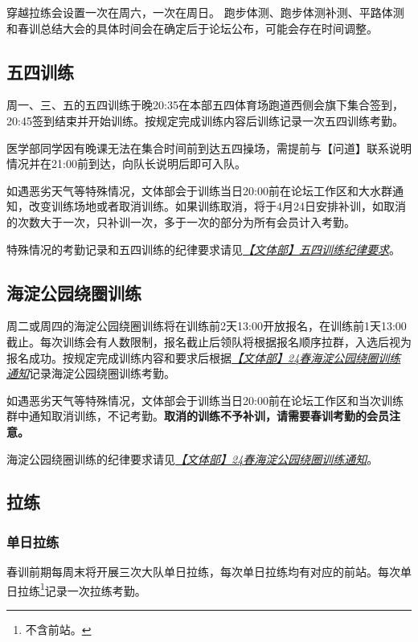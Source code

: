 \documentclass[UTF8]{ctexart}
\begin{document}
穿越拉练会设置一次在周六，一次在周日。
跑步体测、跑步体测补测、平路体测和春训总结大会的具体时间会在确定后于论坛公布，可能会存在时间调整。

\subsection{五四训练}

周一、三、五的五四训练于晚20:35在本部五四体育场跑道西侧会旗下集合签到，20:45签到结束并开始训练。按规定完成训练内容后训练记录一次五四训练考勤。

医学部同学因有晚课无法在集合时间前到达五四操场，需提前与【问道】联系说明情况并在21:00前到达，向队长说明后即可入队。

如遇恶劣天气等特殊情况，文体部会于训练当日20:00前在论坛工作区和大水群通知，改变训练场地或者取消训练。如果训练取消，将于4月24日安排补训，如取消的次数大于一次，只补训一次，多于一次的部分为所有会员计入考勤。

特殊情况的考勤记录和五四训练的纪律要求请见\href{https://chexie.net/bbs/content/index.php?bid=1\&tid=9576\&p=1}{\textit{【文体部】五四训练纪律要求}}。


\subsection{海淀公园绕圈训练}

周二或周四的海淀公园绕圈训练将在训练前2天13:00开放报名，在训练前1天13:00截止。每次训练会有人数限制，报名截止后领队将根据报名顺序拉群，入选后视为报名成功。按规定完成训练内容和要求后根据\href{https://chexie.net/bbs/content/?bid=1&tid=9743&p=1}{\textit{【文体部】24春海淀公园绕圈训练通知}}记录海淀公园绕圈训练考勤。

如遇恶劣天气等特殊情况，文体部会于训练当日20:00前在论坛工作区和当次训练群中通知取消训练，不记考勤。\textbf{取消的训练不予补训，请需要春训考勤的会员注意。}


海淀公园绕圈训练的纪律要求请见\href{https://chexie.net/bbs/content/?bid=1&tid=9743&p=1}{\textit{【文体部】24春海淀公园绕圈训练通知}}。

\subsection{拉练}

\subsubsection{单日拉练}

春训前期每周末将开展三次大队单日拉练，每次单日拉练均有对应的前站。每次单日拉练\footnote{不含前站。}记录一次拉练考勤。
\end{document}
